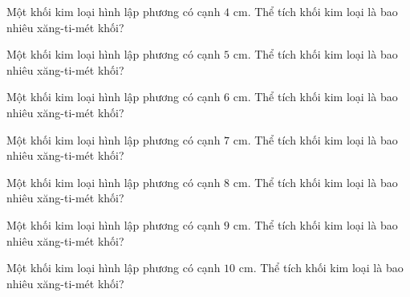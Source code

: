 
\begin{ex}
  Một khối kim loại hình lập phương có cạnh $4\text{ cm}$. Thể tích khối kim loại là bao nhiêu xăng-ti-mét khối?
\end{ex}

\begin{ex}
  Một khối kim loại hình lập phương có cạnh $5\text{ cm}$. Thể tích khối kim loại là bao nhiêu xăng-ti-mét khối?
\end{ex}

\begin{ex}
  Một khối kim loại hình lập phương có cạnh $6\text{ cm}$. Thể tích khối kim loại là bao nhiêu xăng-ti-mét khối?
\end{ex}

\begin{ex}
  Một khối kim loại hình lập phương có cạnh $7\text{ cm}$. Thể tích khối kim loại là bao nhiêu xăng-ti-mét khối?
\end{ex}

\begin{ex}
  Một khối kim loại hình lập phương có cạnh $8\text{ cm}$. Thể tích khối kim loại là bao nhiêu xăng-ti-mét khối?
\end{ex}

\begin{ex}
  Một khối kim loại hình lập phương có cạnh $9\text{ cm}$. Thể tích khối kim loại là bao nhiêu xăng-ti-mét khối?
\end{ex}

\begin{ex}
  Một khối kim loại hình lập phương có cạnh $10\text{ cm}$. Thể tích khối kim loại là bao nhiêu xăng-ti-mét khối?
\end{ex}

